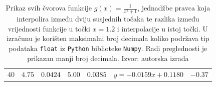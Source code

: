 \documentclass[12pt,a4paper]{report}
\begin{document}
\begin{table}
\begin{center}
\begin{tabular}{c | cc|cc|c|c}
			40 &$4.75$&$0.0424$&$5.00$&$0.0385$&$y = -0.0159x+0.1180$&$-0.37$\\
		\end{tabular}
	\end{center}
	\caption{
		Prikaz svih čvorova funkcije $g(x)=\frac{1}{x^2 +1}$, jednadžbe pravca koja interpolira između dviju susjednih točaka te razlika između vrijednosti funkcije u točki $x=1.2$ i interpolacije u istoj točki. U izračunu je korišten maksimalni broj decimala koliko podržava tip podataka \texttt{float} iz \texttt{Python} biblioteke \texttt{Numpy}. Radi preglednosti je prikazan manji broj decimala. Izvor: autorska izrada}
	\label{linInterpolTablicaDva}
\end{table}
{}

\end{document}

